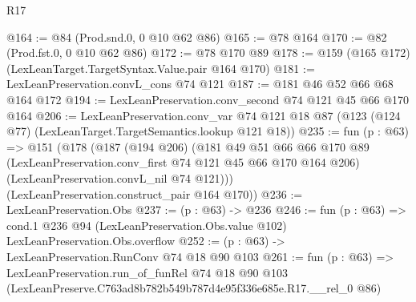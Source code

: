 \begin{lexlean}{R17}
\begin{coremodule}
@164 := @84 (Prod.snd.{0, 0} @10 @62 @86)
@165 := @78 @164
@170 := @82 (Prod.fst.{0, 0} @10 @62 @86)
@172 := @78 @170 @89
@178 := @159 (@165 @172) (LexLeanTarget.TargetSyntax.Value.pair @164 @170)
@181 := LexLeanPreservation.convL_cons @74 @121
@187 := @181 @46 @52 @66 @68 @164 @172
@194 := LexLeanPreservation.conv_second @74 @121 @45 @66 @170 @164
@206 := LexLeanPreservation.conv_var
    @74
    @121
    @18
    @87
    (@123 (@124 @77) (LexLeanTarget.TargetSemantics.lookup @121 @18))
@235 := fun (p : @63) =>
  @151
    (@178
      (@187
        (@194 @206)
        (@181
          @49
          @51
          @66
          @66
          @170
          @89
          (LexLeanPreservation.conv_first @74 @121 @45 @66 @170 @164 @206)
          (LexLeanPreservation.convL_nil @74 @121)))
      (LexLeanPreservation.construct_pair @164 @170))
@236 := LexLeanPreservation.Obs
@237 := (p : @63) -> @236
@246 := fun (p : @63) =>
  cond.{1} @236 @94 (LexLeanPreservation.Obs.value @102) LexLeanPreservation.Obs.overflow
@252 := (p : @63) -> LexLeanPreservation.RunConv @74 @18 @90 @103
@261 := fun (p : @63) =>
  LexLeanPreservation.run_of_funRel
    @74
    @18
    @90
    @103
    (LexLeanPreserve.C763ad8b782b549b787d4e95f336e685e.R17.__rel_0 @86)
\end{coremodule}
\end{lexlean}
